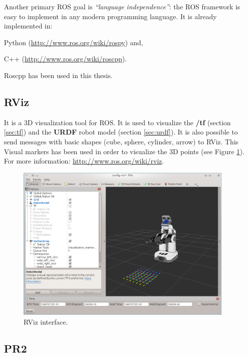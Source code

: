 Another primary ROS goal is \textit{``language independence''}: the ROS framework is easy to implement in any modern programming language. It is already implemented in:
\begin{itemize*}
 \item Python (\url{http://www.ros.org/wiki/rospy}) and,
 \item C++ (\url{http://www.ros.org/wiki/roscpp}).
\end{itemize*}

\noindent
Roscpp has been used in this thesis.


\subsection{RViz}
\label{sec:rviz}

It is a 3D visualization tool for ROS. It is used to visualize the \textbf{/tf} (section \ref{sec:tf}) and the \textbf{URDF} robot model (section \ref{sec:urdf}). It is also possible to send messages with basic shapes (cube, sphere, cylinder, arrow) to RViz. This Visual markers has been used in order to visualize the 3D points (see Figure \ref{fig:rviz}). For more information: \url{http://www.ros.org/wiki/rviz}.
\begin{figure}[!htbp]
 \centering
 \includegraphics[width=0.95\textwidth]{images/screenshots/rviz.png}
 \caption{RViz interface.}
 \label{fig:rviz}
\end{figure}

\subsection{PR2}
\label{sec:PR2}

